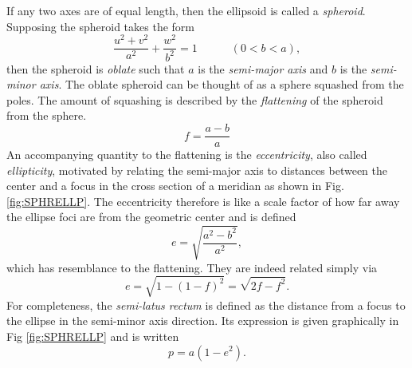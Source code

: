 \documentclass[11pt,dvipsnames]{thesis}
\begin{document}
If any two axes are of equal length, then the ellipsoid is called a \textit{spheroid}. Supposing the spheroid takes the form
\begin{equation}
\frac{u^2 + v^2}{a^2} + \frac{w^2}{b^2} = 1 \qquad\quad (0 < b < a), \label{eq:spheroidEq}
\end{equation}
then the spheroid is \textit{oblate} such that $a$ is the \textit{semi-major axis} and $b$ is the \textit{semi-minor axis}. The oblate spheroid can be thought of as a sphere squashed from the poles. The amount of squashing is described by the \textit{flattening} of the spheroid from the sphere.
\begin{equation}
f = \frac{a - b}{a}
\end{equation}
An accompanying quantity to the flattening is the \textit{eccentricity}, also called \textit{ellipticity}, motivated by relating the semi-major axis to distances between the center and a focus in the cross section of a meridian as shown in Fig. \ref{fig:SPHRELLP}. The eccentricity therefore is like a scale factor of how far away the ellipse foci are from the geometric center and is defined
\begin{equation}
e = \sqrt{\frac{a^2 - b^2}{a^2}},
\end{equation}
which has resemblance to the flattening. They are indeed related simply via
\begin{equation}
e = \sqrt{1 - (1 - f)^2} = \sqrt{2f - f^2}.
\end{equation}
For completeness, the \textit{semi-latus rectum} is defined as the distance from a focus to the ellipse in the semi-minor axis direction. Its expression is given graphically in Fig \ref{fig:SPHRELLP} and is written
\begin{equation}
p = a\left(1 - e^2\right).
\end{equation}
\end{document}
